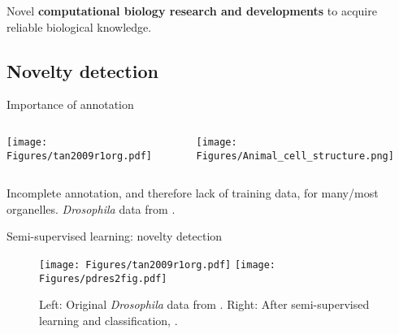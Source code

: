 \begin{frame}{}
  \begin{center}
    \Large{Novel \textbf{computational biology research and developments}
    to acquire reliable biological knowledge.}
  \end{center}
\end{frame}

\subsection{Novelty detection}

\begin{frame}{Importance of annotation}

  \begin{columns}[t]
    \begin{column}[T]{0.43\textwidth}
      \begin{centering}
        \texttt{[image: Figures/tan2009r1org.pdf]}
      \end{centering}
    \end{column}
    \begin{column}[T]{0.56\textwidth}
      \texttt{[image: Figures/Animal\_cell\_structure.png]}
    \end{column}
  \end{columns}
  Incomplete annotation, and therefore lack of training data, for
  many/most organelles. \textit{Drosophila} data from \cite{Tan2009}.
\end{frame}

\begin{frame}{Semi-supervised learning: novelty detection}
  \begin{figure}
    \texttt{[image: Figures/tan2009r1org.pdf]}
    \texttt{[image: Figures/pdres2fig.pdf]}
    \caption{Left: Original \textit{Drosophila} data from
      \cite{Tan2009}. Right: After semi-supervised learning and
      classification, \cite{Breckels:2013}.}
  \end{figure}
\end{frame}


